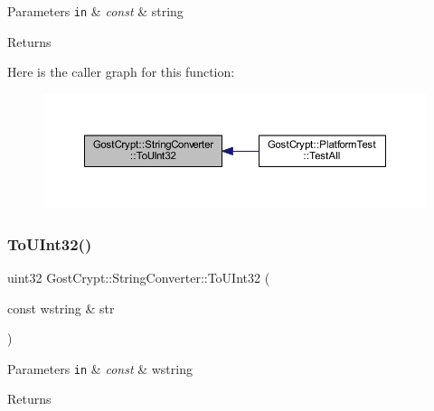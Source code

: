 \begin{DoxyParams}[1]{Parameters}
\mbox{\tt in}  & {\em const} & string \\
\hline
\end{DoxyParams}
\begin{DoxyReturn}{Returns}

\end{DoxyReturn}
Here is the caller graph for this function\+:
\nopagebreak
\begin{figure}[H]
\begin{center}
\leavevmode
\includegraphics[width=350pt]{class_gost_crypt_1_1_string_converter_a339be9ee8d5d59aa831e76b12dbbb21f_icgraph}
\end{center}
\end{figure}
\mbox{\label{class_gost_crypt_1_1_string_converter_a23476c43767a021a338e150d91380caa}} 
\subsubsection{\texorpdfstring{To\+U\+Int32()}{ToUInt32()}\hspace{0.1cm}{\footnotesize\ttfamily [2/2]}}
{\footnotesize\ttfamily uint32 Gost\+Crypt\+::\+String\+Converter\+::\+To\+U\+Int32 (\begin{DoxyParamCaption}\item[{const wstring \&}]{str }\end{DoxyParamCaption})\hspace{0.3cm}{\ttfamily [static]}}


\begin{DoxyParams}[1]{Parameters}
\mbox{\tt in}  & {\em const} & wstring \\
\hline
\end{DoxyParams}
\begin{DoxyReturn}{Returns}

\end{DoxyReturn}
\mbox{\label{class_gost_crypt_1_1_string_converter_ada0fc4768185c72b861c48904da33d56}} 

